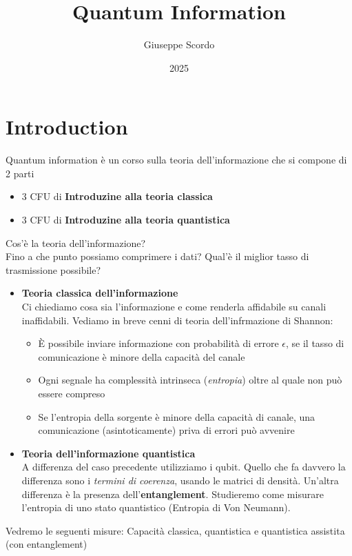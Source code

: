 \documentclass{report}
\title{Quantum Information}
\date{2025}
\author{Giuseppe Scordo}
\begin{document}
\maketitle

\chapter{Introduction}

Quantum information è un corso sulla teoria dell'informazione che si compone di 2 parti
\begin{itemize}
    \item 3 CFU di \textbf{Introduzine alla teoria classica}
    \item 3 CFU di \textbf{Introduzine alla teoria quantistica}
\end{itemize}
Cos'è la teoria dell'informazione?
\\Fino a che punto possiamo comprimere i dati? Qual'è il miglior tasso di trasmissione possibile?
\begin{itemize}
    \item \textbf{Teoria classica dell'informazione}
    \\ Ci chiediamo cosa sia l'informazione e come renderla affidabile su canali inaffidabili. Vediamo in breve cenni di teoria dell'infrmazione di Shannon:
    \begin{itemize}
        \item È possibile inviare informazione con probabilità di errore $\epsilon$, se il tasso di comunicazione è minore della capacità del canale
        \item Ogni segnale ha complessità intrinseca (\textit{entropia}) oltre al quale non può essere compreso
        \item Se l'entropia della sorgente è minore della capacità di canale, una comunicazione (asintoticamente) priva di errori può avvenire
    \end{itemize}
    \item  \textbf{Teoria dell'informazione quantistica}
    \\A differenza del caso precedente utilizziamo i qubit. Quello che fa davvero la differenza sono i \textit{termini di coerenza}, usando le matrici di densità. 
    Un'altra differenza è la presenza dell'\textbf{entanglement}.
    Studieremo come misurare l'entropia di uno stato quantistico (Entropia di Von Neumann).
\end{itemize}
Vedremo le seguenti misure: Capacità classica, quantistica e quantistica assistita (con entanglement)
\end{document}
